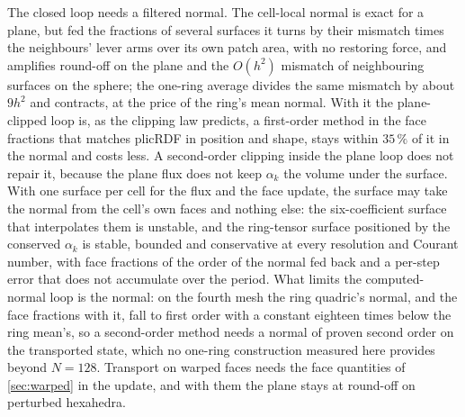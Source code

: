 The closed loop needs a filtered normal. The cell-local normal is exact for a plane, but fed the fractions of several surfaces it turns by their mismatch times the neighbours' lever arms over its own patch area, with no restoring force, and amplifies round-off on the plane and the $O(h^2)$ mismatch of neighbouring surfaces on the sphere; the one-ring average divides the same mismatch by about $9h^2$ and contracts, at the price of the ring's mean normal. With it the plane-clipped loop is, as the clipping law predicts, a first-order method in the face fractions that matches plicRDF in position and shape, stays within $35\,\%$ of it in the normal and costs less. A second-order clipping inside the plane loop does not repair it, because the plane flux does not keep $\alpha_k$ the volume under the surface. With one surface per cell for the flux and the face update, the surface may take the normal from the cell's own faces and nothing else: the six-coefficient surface that interpolates them is unstable, and the ring-tensor surface positioned by the conserved $\alpha_k$ is stable, bounded and conservative at every resolution and Courant number, with face fractions of the order of the normal fed back and a per-step error that does not accumulate over the period. What limits the computed-normal loop is the normal: on the fourth mesh the ring quadric's normal, and the face fractions with it, fall to first order with a constant eighteen times below the ring mean's, so a second-order method needs a normal of proven second order on the transported state, which no one-ring construction measured here provides beyond $N = 128$. Transport on warped faces needs the face quantities of \cref{sec:warped} in the update, and with them the plane stays at round-off on perturbed hexahedra.

